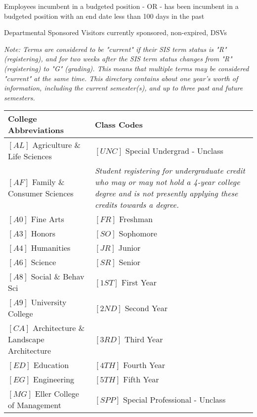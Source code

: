 \documentclass[12pt,notitlepage]{article}
\begin{document}
{Employees
incumbent in a budgeted position
- OR -
has been incumbent in a budgeted position with an end date less than 100 days in the past

Departmental Sponsored Visitors
currently sponsored, non-expired, DSVs
					
\emph{Note: Terms are considered to be "current" if their SIS term status is "R" (registering), and for two weeks after the SIS term status changes from "R" (registering) to "G" (grading). This means that multiple terms may be considered "current" at the same time. This directory contains about one year's worth of information, including the current semester(s), and up to three past and future semesters.}
					

\begin{tabular}{|p{7cm}|p{7cm}|}
\hline
\textbf{College Abbreviations}& \textbf{Class Codes} \\
\hline
$\left[ AL \right]$ Agriculture \& Life Sciences & $\left[ UNC \right]$ Special Undergrad - Unclass\\
\hline
$\left[ AF \right]$ Family \& Consumer Sciences & \emph{Student registering for undergraduate credit who may or may not hold a 4-year college degree and is not presently applying these credits towards a degree. }\\
\hline
$\left[ A0 \right]$ Fine Arts & $\left[ FR \right]$ Freshman 				\\
\hline
$\left[ A3 \right]$ Honors 	& $\left[ SO \right]$ Sophomore 				\\
\hline
$\left[ A4 \right]$ Humanities &	$\left[ JR \right]$ Junior 				\\
\hline
$\left[ A6 \right]$ Science &	$\left[ SR \right]$ Senior 				\\
\hline
$\left[ A8 \right]$ Social \& Behav Sci &	$\left[ 1ST \right]$ First Year \\				
\hline
$\left[ A9 \right]$ University College 	& $\left[ 2ND \right]$ Second Year 		\\		
\hline
$\left[ CA \right]$ Architecture \& Landscape Architecture &	$\left[ 3RD \right]$ Third Year \\				
\hline
$\left[ ED \right]$ Education &	$\left[ 4TH \right]$ Fourth Year 				\\
\hline
$\left[ EG \right]$ Engineering & $\left[ 5TH \right]$ Fifth Year 				\\
\hline
$\left[ MG \right]$ Eller College of Management & $\left[ SPP \right]$ Special Professional - Unclass 			\\	
\hline

\end{tabular}}
\end{document}
